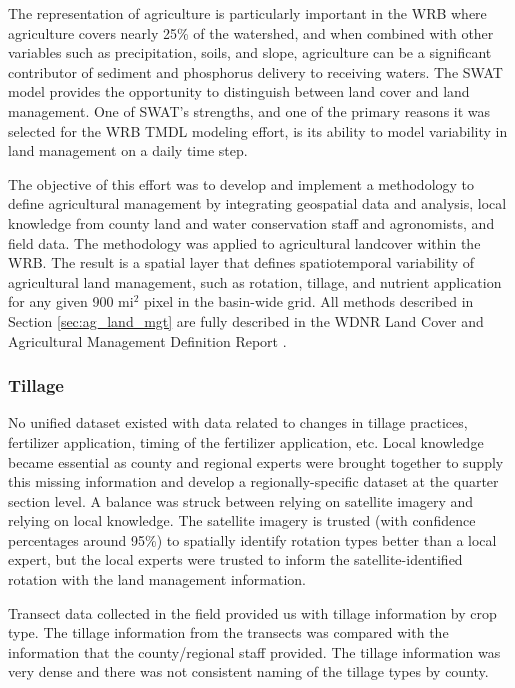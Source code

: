 
The representation of agriculture is particularly important in the WRB where agriculture covers nearly
25\% of the watershed, and when combined with other variables such as precipitation, soils,
and slope, agriculture can be a significant contributor of sediment and phosphorus delivery to receiving waters.  The SWAT model provides the opportunity to distinguish between land cover and land management.  One of SWAT’s strengths, and one of the primary reasons it was selected for the WRB TMDL modeling effort, is its ability to model variability in land management on a daily time step.

The objective of this effort was to develop and implement a methodology to define agricultural management by integrating geospatial data and analysis, local knowledge from county land and water conservation staff and agronomists, and field data. The methodology was applied to agricultural landcover within the WRB. The result is a spatial layer that defines spatiotemporal variability of agricultural land management, such as rotation, tillage, and nutrient application for any given 900 mi$^2$ pixel in the basin-wide grid. All methods described in Section \ref{sec:ag_land_mgt} are fully described in the WDNR Land Cover and Agricultural Management Definition Report .

\subsubsection{Tillage}

No unified dataset existed with data related to changes in tillage practices, fertilizer application, timing of the fertilizer application, etc.  Local knowledge became essential as county and regional experts were brought together to supply this missing information and develop a regionally-specific dataset at the quarter section level. A balance was struck between relying on satellite imagery and relying on local knowledge. The satellite imagery is trusted (with confidence percentages around 95\%) to spatially identify rotation types better than a local expert, but the local experts were trusted to inform the satellite-identified rotation with the land management information.  

Transect data collected in the field provided us with tillage information by crop type. The tillage information from the transects was compared with the information that the county/regional staff provided. The tillage information was very dense and there was not consistent naming of the tillage types by county.

